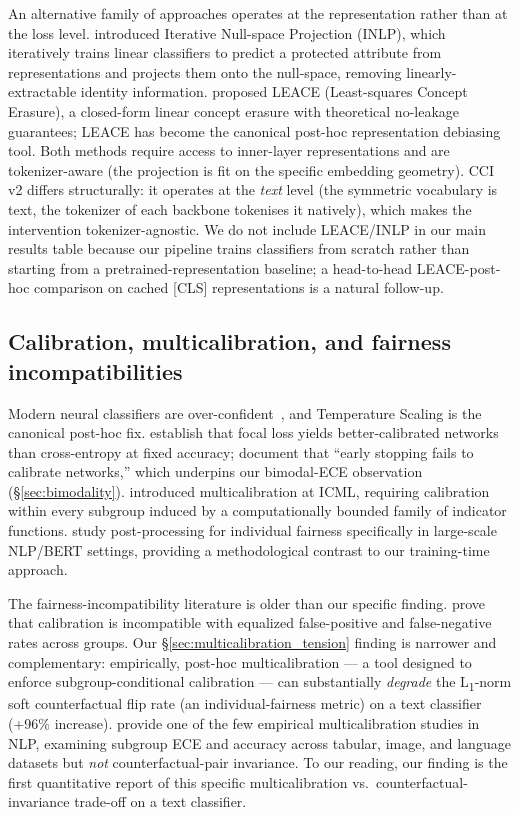 \documentclass[10pt,a4paper]{article}
\begin{document}
An alternative family of approaches operates at the representation rather than at the loss level. \citet{ravfogel2020null} introduced Iterative Null-space Projection (INLP), which iteratively trains linear classifiers to predict a protected attribute from representations and projects them onto the null-space, removing linearly-extractable identity information. \citet{belrose2023leace} proposed LEACE (Least-squares Concept Erasure), a closed-form linear concept erasure with theoretical no-leakage guarantees; LEACE has become the canonical post-hoc representation debiasing tool. Both methods require access to inner-layer representations and are tokenizer-aware (the projection is fit on the specific embedding geometry). CCI v2 differs structurally: it operates at the \emph{text} level (the symmetric vocabulary is text, the tokenizer of each backbone tokenises it natively), which makes the intervention tokenizer-agnostic. We do not include LEACE/INLP in our main results table because our pipeline trains classifiers from scratch rather than starting from a pretrained-representation baseline; a head-to-head LEACE-post-hoc comparison on cached [CLS] representations is a natural follow-up.

\subsection{Calibration, multicalibration, and fairness incompatibilities}
\label{sec:related:calibration}

Modern neural classifiers are over-confident~\citep{guo2017calibration}, and Temperature Scaling is the canonical post-hoc fix. \citet{mukhoti2020calibrating} establish that focal loss yields better-calibrated networks than cross-entropy at fixed accuracy; \citet{tao2023pcs} document that ``early stopping fails to calibrate networks,'' which underpins our bimodal-ECE observation (\S\ref{sec:bimodality}). \citet{hebertjohnson2018multicalibration} introduced multicalibration at ICML, requiring calibration within every subgroup induced by a computationally bounded family of indicator functions. \citet{petersen2021post} study post-processing for individual fairness specifically in large-scale NLP/BERT settings, providing a methodological contrast to our training-time approach.

The fairness-incompatibility literature is older than our specific finding. \citet{pleiss2017fairness} prove that calibration is incompatible with equalized false-positive and false-negative rates across groups. Our \S\ref{sec:multicalibration_tension} finding is narrower and complementary: empirically, post-hoc multicalibration --- a tool designed to enforce subgroup-conditional calibration --- can substantially \emph{degrade} the L\textsubscript{1}-norm soft counterfactual flip rate (an individual-fairness metric) on a text classifier (+96\% increase). \citet{hansen2024multicalibration} provide one of the few empirical multicalibration studies in NLP, examining subgroup ECE and accuracy across tabular, image, and language datasets but \emph{not} counterfactual-pair invariance. To our reading, our finding is the first quantitative report of this specific multicalibration vs.\ counterfactual-invariance trade-off on a text classifier.
\end{document}
